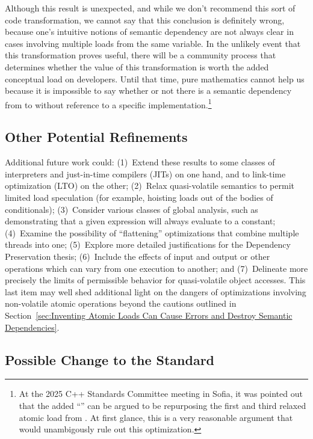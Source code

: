 Although this result is unexpected, and while we don't recommend this sort of
code transformation, we cannot say that this conclusion is definitely
wrong, because one's intuitive notions of semantic dependency are not
always clear in cases involving multiple loads from the same variable.
In the unlikely event that this transformation proves useful, there
will be a community process that determines whether the value of this
transformation is worth the added conceptual load on developers.
Until that time, pure mathematics cannot help us because it is
impossible to say whether or not there is a semantic dependency from
 to  without reference to a specific implementation.\footnote{
	At the 2025 C++ Standards Committee meeting in Sofia, it was
	pointed out that the added ``'' can be argued
	to be repurposing the first and third relaxed atomic load from
	.
	At first glance, this is a very reasonable argument that would
	unambigously rule out this optimization.}

\subsection{Other Potential Refinements}
\label{sec:Other Potential Refinements}

Additional future work could:
(1)~Extend these results to some classes of interpreters and just-in-time
compilers (JITs) on
one hand, and to link-time optimization (LTO) on the other;
(2)~Relax quasi-volatile semantics to permit limited load speculation
(for example, hoisting loads out of the bodies of conditionals);
(3)~Consider various classes of global analysis, such as
demonstrating that a given expression will always evaluate to a constant;
(4)~Examine the possibility of ``flattening'' optimizations that combine
multiple threads into one;
(5)~Explore more detailed justifications for the Dependency Preservation thesis;
(6)~Include the effects of input and output or other operations which
can vary from one execution to another; and
(7)~Delineate more precisely the limits of permissible behavior for
quasi-volatile object accesses.
This last item may well shed additional light on the dangers of
optimizations involving non-volatile atomic operations beyond the cautions
outlined in
Section~\ref{sec:Inventing Atomic Loads Can Cause Errors and
Destroy Semantic Dependencies}.

\subsection{Possible Change to the Standard}
\label{sec:Possible Change to the Standard}

